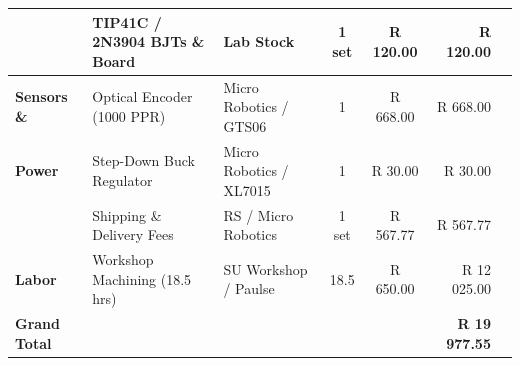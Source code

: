 \begin{table}[H]
{\begin{tabular}{lllccrr}
			& TIP41C / 2N3904 BJTs \& Board    & Lab Stock                 & 1 set & R 120.00 & R 120.00 \\
			\midrule
			\textbf{Sensors \&}  & Optical Encoder (1000 PPR)      & Micro Robotics / GTS06    & 1 & R 668.00 & R 668.00 \\
			\textbf{Power}       & Step-Down Buck Regulator        & Micro Robotics / XL7015   & 1 & R 30.00  & R 30.00 \\
			& Shipping \& Delivery Fees       & RS / Micro Robotics       & 1 set & R 567.77 & R 567.77 \\
			\midrule
			\textbf{Labor}       & Workshop Machining (18.5 hrs)   & SU Workshop / Paulse      & 18.5 & R 650.00 & R 12 025.00 \\
			\midrule
			\textbf{Grand Total} & & & & & \textbf{R 19 977.55} \\
			\bottomrule
		\end{tabular}%
	}
\end{table}
